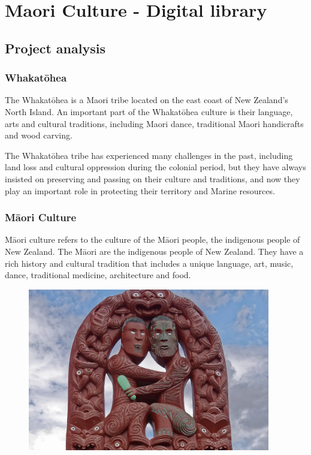 \chapter{Maori Culture - Digital library}

\section{Project analysis}
\subsection{Whakatōhea}
The Whakatōhea is a Maori tribe located on the east coast of New Zealand's North Island. An important part of the Whakatōhea culture is their language, arts and cultural traditions, including Maori dance, traditional Maori handicrafts and wood carving\cite{AboutUsW73:online}.

The Whakatōhea tribe has experienced many challenges in the past, including land loss and cultural oppression during the colonial period, but they have always insisted on preserving and passing on their culture and traditions, and now they play an important role in protecting their territory and Marine resources\cite{Aboutthi75:online}.

\subsection{Māori Culture}
Māori culture refers to the culture of the Māori people, the indigenous people of New Zealand. The Māori are the indigenous people of New Zealand. They have a rich history and cultural tradition that includes a unique language, art, music, dance, traditional medicine, architecture and food.

\begin{figure}[htbp]
  \centerline{\includegraphics[width=300pt]{images/M1-1.png}}
\end{figure}

